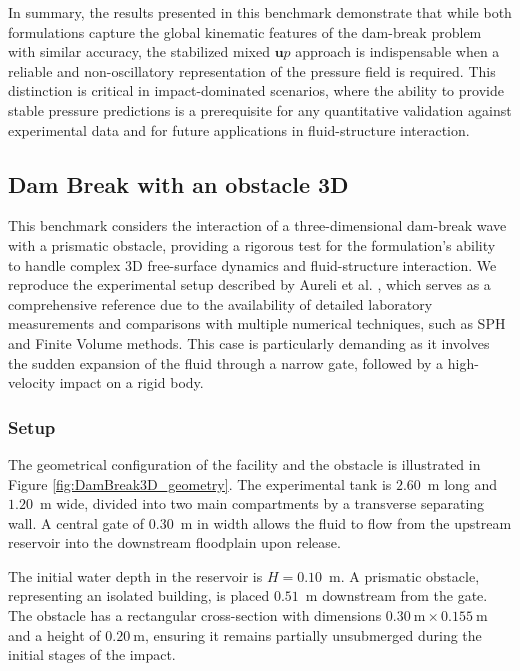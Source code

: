 \documentclass[11pt,english]{article}
\def\up{$\boldsymbol{u}p$\xspace}
\begin{document}
In summary, the results presented in this benchmark demonstrate that while both formulations capture the global kinematic features of the dam-break problem with similar accuracy, the stabilized mixed \up approach is indispensable when a reliable and non-oscillatory representation of the pressure field is required. This distinction is critical in impact-dominated scenarios, where the ability to provide stable pressure predictions is a prerequisite for any quantitative validation against experimental data and for future applications in fluid-structure interaction.

\subsection{Dam Break with an obstacle 3D}

This benchmark considers the interaction of a three-dimensional dam-break wave with a prismatic obstacle, providing a rigorous test for the formulation's ability to handle complex 3D free-surface dynamics and fluid-structure interaction. We reproduce the experimental setup described by Aureli et al. \cite{aureli2015experimental}, which serves as a comprehensive reference due to the availability of detailed laboratory measurements and comparisons with multiple numerical techniques, such as SPH and Finite Volume methods. This case is particularly demanding as it involves the sudden expansion of the fluid through a narrow gate, followed by a high-velocity impact on a rigid body.


\subsubsection{Setup}

The geometrical configuration of the facility and the obstacle is illustrated in Figure \ref{fig:DamBreak3D_geometry}. The experimental tank is $2.60$~m long and $1.20$~m wide, divided into two main compartments by a transverse separating wall. A central gate of $0.30$~m in width allows the fluid to flow from the upstream reservoir into the downstream floodplain upon release. 

The initial water depth in the reservoir is $H = 0.10$~m. A prismatic obstacle, representing an isolated building, is placed $0.51$~m downstream from the gate. The obstacle has a rectangular cross-section with dimensions $0.30~\text{m} \times 0.155~\text{m}$ and a height of $0.20~\text{m}$, ensuring it remains partially unsubmerged during the initial stages of the impact.
\end{document}
